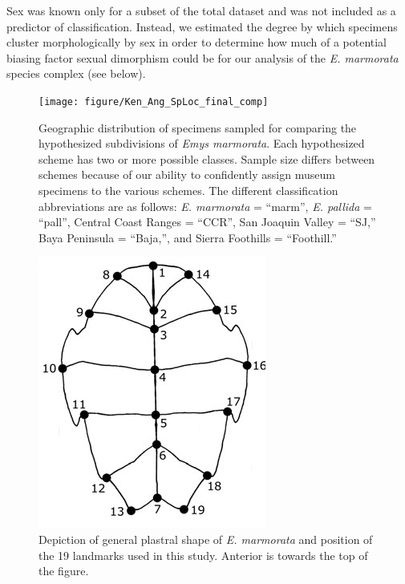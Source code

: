 \documentclass[12pt,letterpaper]{article}
\begin{document}
Sex was known only for a subset of the total dataset and was not included as a predictor of classification. Instead, we estimated the degree by which specimens cluster morphologically by sex in order to determine how much of a potential biasing factor sexual dimorphism could be for our analysis of the \textit{E. marmorata} species complex (see below).


\begin{figure}[h]
  \centering
  \texttt{[image: figure/Ken\_Ang\_SpLoc\_final\_comp]}
  \caption{Geographic distribution of specimens sampled for comparing the hypothesized subdivisions of \textit{Emys marmorata}. Each hypothesized scheme has two or more possible classes. Sample size differs between schemes because of our ability to confidently assign museum specimens to the various schemes. The different classification abbreviations are as follows: \textit{E. marmorata} = ``marm'', \textit{E. pallida} = ``pall'', Central Coast Ranges = ``CCR'', San Joaquin Valley = ``SJ,'' Baya Peninsula = ``Baja,'', and Sierra Foothills = ``Foothill.''}
  \label{fig:map}
\end{figure}

\begin{figure}[h]
  \centering
  \includegraphics[height = 0.5\textheight, width = \textwidth, keepaspectratio = true]{figure/plastra}
  \caption{Depiction of general plastral shape of \textit{E. marmorata} and position of the 19 landmarks used in this study. Anterior is towards the top of the figure.}
  \label{fig:plastra}
\end{figure}
\end{document}
